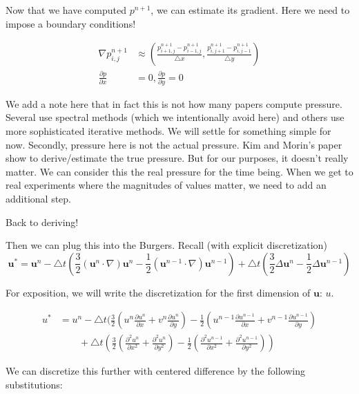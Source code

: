 \documentclass[12pt]{article}
\begin{document}
Now that we have computed $p^{n+1}$, we can estimate its gradient. Here we need to impose a boundary conditions!

\begin{align*}
    \nabla p^{n+1}_{i,j} &\approx (\frac{p^{n+1}_{i+1,j} - p^{n+1}_{i-1,j}}{\bigtriangleup x}, \frac{p^{n+1}_{i,j+1} - p^{n+1}_{i,j-1}}{\bigtriangleup y}) \\
    \frac{\partial p}{\partial x} &= 0,
    \frac{\partial p}{\partial y} = 0
\end{align*}

We add a note here that in fact this is not how many papers compute pressure. Several use spectral methods (which we intentionally avoid here) and others use more sophisticated iterative methods. We will settle for something simple for now. Secondly, pressure here is not the actual pressure. Kim and Morin's paper show to derive/estimate the true pressure. But for our purposes, it doesn't really matter. We can consider this the real pressure for the time being. When we get to real experiments where the magnitudes of values matter, we need to add an additional step.

Back to deriving!

Then we can plug this into the Burgers. Recall (with explicit discretization)
\begin{equation}
    \mathbf{u}^* = \mathbf{u}^n - \bigtriangleup t (\frac{3}{2}(\mathbf{u}^n \cdot \nabla)\mathbf{u}^n - \frac{1}{2}(\mathbf{u}^{n-1} \cdot \nabla)\mathbf{u}^{n-1}) + \bigtriangleup t (\frac{3}{2}\Delta \mathbf{u}^n - \frac{1}{2} \Delta \mathbf{u}^{n-1})
\end{equation}

For exposition, we will write the discretization for the first dimension of $\mathbf{u}$: $u$.

\begin{align*}
u^* &= u^n - \bigtriangleup t (\frac{3}{2}(u^n\frac{\partial u^n}{\partial x} + v^n \frac{\partial u^n}{\partial y}) - \frac{1}{2}(u^{n-1}\frac{\partial u^{n-1}}{\partial x} + v^{n-1} \frac{\partial u^{n-1}}{\partial y}) \\
    &\qquad + \bigtriangleup t (\frac{3}{2}(\frac{\partial^2 u^n}{\partial x^2} + \frac{\partial^2 u^n}{\partial y^2}) - \frac{1}{2}(\frac{\partial^2 u^{n-1}}{\partial x^2} + \frac{\partial^2 u^{n-1}}{\partial y^2}))
\end{align*}

We can discretize this further with centered difference by the following substitutions:
\end{document}
